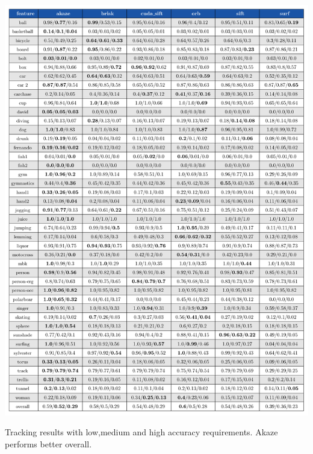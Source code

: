 \begin{table}[h]
\centerline{%
		\includegraphics[width=0.98\linewidth]{tables/tracking_precision.pdf}}
    \vspace{-2mm} 
	\caption{Tracking results with low,medium and high accuracy requirements. Akaze performs better overall.}
	\label{table:taccuracy}
\end{table}